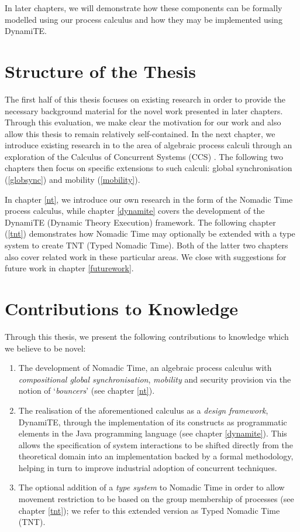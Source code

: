 In later chapters, we will demonstrate how these components can be
formally modelled using our process calculus and how they may be
implemented using DynamiTE.

\section{Structure of the Thesis}

The first half of this thesis focuses on existing research in order to
provide the necessary background material for the novel work presented
in later chapters.  Through this evaluation, we make clear the
motivation for our work and also allow this thesis to remain
relatively self-contained.  In the next chapter, we introduce existing
research in to the area of algebraic process calculi through an
exploration of the Calculus of Concurrent Systems (CCS)
\cite{milner:ccs}.  The following two chapters then focus on specific
extensions to such calculi: global synchronisation (\ref{globsync})
and mobility (\ref{mobility}).

In chapter \ref{nt}, we introduce our own research in the form of the
Nomadic Time process calculus, while chapter \ref{dynamite} covers the
development of the DynamiTE (Dynamic Theory Execution) framework.  The
following chapter (\ref{tnt}) demonstrates how Nomadic Time may
optionally be extended with a type system to create TNT (Typed Nomadic
Time).  Both of the latter two chapters also cover related work in
these particular areas.  We close with suggestions for future work in
chapter \ref{futurework}.

\section{Contributions to Knowledge}

Through this thesis, we present the following contributions to
knowledge which we believe to be novel:

\begin{enumerate}
\item The development of Nomadic Time, an algebraic process calculus
  with \emph{compositional global synchronisation}, \emph{mobility}
  and security provision via the notion of `\emph{bouncers}'
  (see chapter \ref{nt}).
\item The realisation of the aforementioned calculus as a \emph{design
  framework}, DynamiTE, through the implementation of its constructs
  as programmatic elements in the Java programming language (see
  chapter \ref{dynamite}).  This allows the specification of system
  interactions to be shifted directly from the theoretical domain into
  an implementation backed by a formal methodology, helping in turn to
  improve industrial adoption of concurrent techniques.
\item The optional addition of a \emph{type system} to Nomadic Time in
  order to allow movement restriction to be based on the group
  membership of processes (see chapter \ref{tnt}); we refer to this
  extended version as Typed Nomadic Time (TNT).
\end{enumerate}

